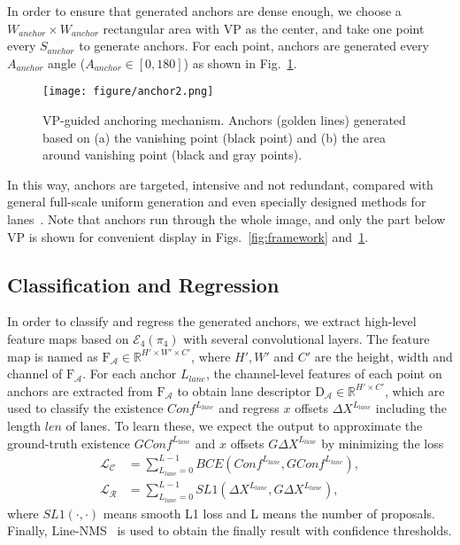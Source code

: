 \documentclass{article}
\begin{document}
In order to ensure that generated anchors are dense enough, we choose a $W_{anchor} \times W_{anchor}$ rectangular area with VP as the center, and take one point every $S_{anchor}$ to generate anchors. For each point, anchors are generated every $A_{anchor}$ angle ($A_{anchor} \in [0, 180]$) as shown in Fig.~\ref{fig:anchor}. \begin{figure}[t]
\centering
\texttt{[image: figure/anchor2.png]}
\caption{VP-guided anchoring mechanism. Anchors (golden lines) generated based on (a) the vanishing point (black point) and (b) the area around vanishing point (black and gray points). }
\label{fig:anchor}
\end{figure}
In this way, anchors are targeted, intensive and not redundant, compared with general full-scale uniform generation and even specially designed methods for lanes~\cite{li2019line}. 
Note that anchors run through the whole image, and only the part below VP is shown for convenient display in Figs.~\ref{fig:framework} and~\ref{fig:anchor}.


\subsection{Classification and Regression}
In order to classify and regress the generated anchors, we extract high-level feature maps based on  $\mathcal{E}_4(\pi_4)$ with several convolutional layers. The feature map is named as $\text{F}_{\mathcal{A}} \in \mathbb{R}^{H' \times W' \times C'}$, where $H', W'$ and $C'$ are the height, width and channel of $\text{F}_{\mathcal{A}}$. For each anchor $L_{lane}$, the channel-level features of each point on anchors are extracted from $\text{F}_{\mathcal{A}}$ to obtain lane descriptor $\text{D}_{\mathcal{A}} \in  \mathbb{R}^{H' \times C'}$, which are used to classify the existence $Conf^{L_{lane}}$ and regress $x$ offsets $\Delta X^{L_{lane}}$ including the length $len$ of lanes. To learn these, we expect the output to approximate the ground-truth existence $GConf^{L_{lane}}$ and $x$ offsets $G\Delta X^{L_{lane}}$  by minimizing the loss
\begin{equation}
\begin{aligned}
{\mathcal{L}}_{\mathcal{C}} &= \sum_{L_{lane} = 0}^{L-1}BCE(Conf^{L_{lane}}, GConf^{L_{lane}}),  \\
{\mathcal{L}}_{\mathcal{R}} &= \sum_{L_{lane} = 0}^{L-1}SL1(\Delta X^{L_{lane}}, G\Delta X^{L_{lane}}),
\end{aligned}
\label{eq:class_regress_loss_ori}
\end{equation}
where $SL1(\cdot, \cdot)$ means smooth L1 loss and L means the number of proposals. Finally, Line-NMS~\cite{li2019line} is used to obtain the finally result with confidence thresholds.
\end{document}
